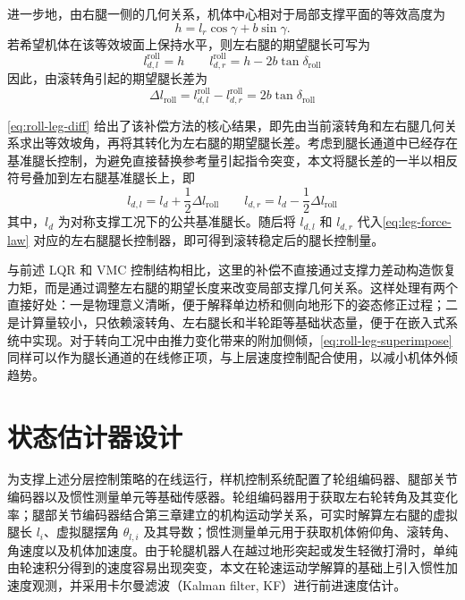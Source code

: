 进一步地，由右腿一侧的几何关系，机体中心相对于局部支撑平面的等效高度为
\begin{equation}
  h
  =
  l_r\cos\gamma + b\sin\gamma.
  \label{eq:roll-body-height}
\end{equation}
若希望机体在该等效坡面上保持水平，则左右腿的期望腿长可写为
\begin{equation}
  l_{d,l}^{\mathrm{roll}} = h
  \qquad
  l_{d,r}^{\mathrm{roll}} = h - 2b\tan \delta_{\mathrm{roll}}
  \label{eq:roll-leg-target}
\end{equation}
因此，由滚转角引起的期望腿长差为
\begin{equation}
  \Delta l_{\mathrm{roll}}
  =
  l_{d,l}^{\mathrm{roll}} - l_{d,r}^{\mathrm{roll}}
  =
  2b\tan \delta_{\mathrm{roll}}
  \label{eq:roll-leg-diff}
\end{equation}

\eqref{eq:roll-leg-diff} 给出了该补偿方法的核心结果，即先由当前滚转角和左右腿几何关系求出等效坡角，再将其转化为左右腿的期望腿长差。考虑到腿长通道中已经存在基准腿长控制，为避免直接替换参考量引起指令突变，本文将腿长差的一半以相反符号叠加到左右腿基准腿长上，即
\begin{equation}
  l_{d,l} = l_d + \frac{1}{2}\Delta l_{\mathrm{roll}}
  \qquad
  l_{d,r} = l_d - \frac{1}{2}\Delta l_{\mathrm{roll}}
  \label{eq:roll-leg-superimpose}
\end{equation}
其中，$l_d$ 为对称支撑工况下的公共基准腿长。随后将 $l_{d,l}$ 和 $l_{d,r}$ 代入\eqref{eq:leg-force-law} 对应的左右腿腿长控制器，即可得到滚转稳定后的腿长控制量。

与前述 LQR 和 VMC 控制结构相比，这里的补偿不直接通过支撑力差动构造恢复力矩，而是通过调整左右腿的期望长度来改变局部支撑几何关系。这样处理有两个直接好处：一是物理意义清晰，便于解释单边桥和侧向地形下的姿态修正过程；二是计算量较小，只依赖滚转角、左右腿长和半轮距等基础状态量，便于在嵌入式系统中实现。对于转向工况中由推力变化带来的附加侧倾，\eqref{eq:roll-leg-superimpose} 同样可以作为腿长通道的在线修正项，与上层速度控制配合使用，以减小机体外倾趋势。

\section{状态估计器设计}

为支撑上述分层控制策略的在线运行，样机控制系统配置了轮组编码器、腿部关节编码器以及惯性测量单元等基础传感器。轮组编码器用于获取左右轮转角及其变化率；腿部关节编码器结合第三章建立的机构运动学关系，可实时解算左右腿的虚拟腿长 $l_i$、虚拟腿摆角 $\theta_{l,i}$ 及其导数；惯性测量单元用于获取机体俯仰角、滚转角、角速度以及机体加速度。由于轮腿机器人在越过地形突起或发生轻微打滑时，单纯由轮速积分得到的速度容易出现突变，本文在轮速运动学解算的基础上引入惯性加速度观测，并采用卡尔曼滤波（Kalman filter, KF）进行前进速度估计\cite{kalman1960new}。

